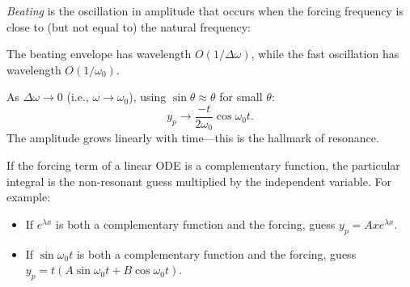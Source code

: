 \documentclass[a4paper]{article}
\begin{document}
\begin{defi}[Beating]
  \emph{Beating} is the oscillation in amplitude that occurs when the forcing frequency is close to (but not equal to) the natural frequency:
  \begin{center}
  \end{center}
  The beating envelope has wavelength $O(1/\Delta\omega)$, while the fast oscillation has wavelength $O(1/\omega_0)$.
\end{defi}

\begin{prop}
  As $\Delta\omega \to 0$ (i.e., $\omega \to \omega_0$), using $\sin\theta \approx \theta$ for small $\theta$:
  \[
    y_p \to \frac{-t}{2\omega_0}\cos\omega_0 t.
  \]
  The amplitude grows linearly with time---this is the hallmark of resonance.
\end{prop}

\begin{prop}
  If the forcing term of a linear ODE is a complementary function, the particular integral is the non-resonant guess multiplied by the independent variable. For example:
  \begin{itemize}
    \item If $e^{\lambda x}$ is both a complementary function and the forcing, guess $y_p = Axe^{\lambda x}$.
    \item If $\sin \omega_0 t$ is both a complementary function and the forcing, guess $y_p = t(A\sin \omega_0 t + B\cos \omega_0 t)$.
  \end{itemize}
\end{prop}
\end{document}
